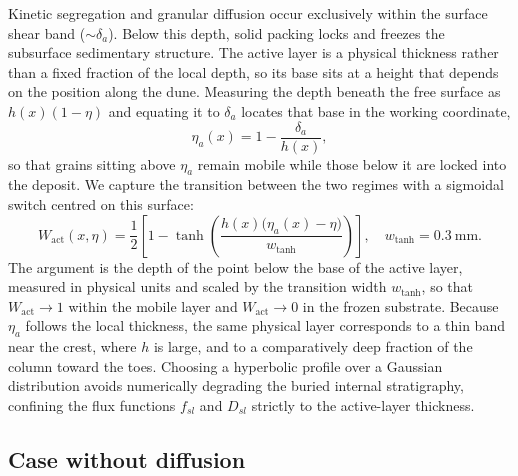 \documentclass[lineno]{JFM-FLM_Au}
\begin{document}
Kinetic segregation and granular diffusion occur exclusively within the surface shear band ($\sim \delta_a$). Below this depth, solid packing locks and freezes the subsurface sedimentary structure. The active layer is a physical thickness rather than a fixed fraction of the local depth, so its base sits at a height that depends on the position along the dune. Measuring the depth beneath the free surface as $h(x)(1-\eta)$ and equating it to $\delta_a$ locates that base in the working coordinate,
\begin{equation}
    \eta_a(x) = 1 - \frac{\delta_a}{h(x)},
    \label{eq:etaa}
\end{equation}
so that grains sitting above $\eta_a$ remain mobile while those below it are locked into the deposit. We capture the transition between the two regimes with a sigmoidal switch centred on this surface:
\begin{equation}
    W_{\mathrm{act}}(x,\eta) = \frac{1}{2}\left[1 - \tanh\!\left(\frac{h(x)\big(\eta_a(x)-\eta\big)}{w_{\tanh}}\right)\right], \quad w_{\tanh} = 0.3~\mathrm{mm}.
    \label{eq:Wact}
\end{equation}
The argument is the depth of the point below the base of the active layer, measured in physical units and scaled by the transition width $w_{\tanh}$, so that $W_{\mathrm{act}} \to 1$ within the mobile layer and $W_{\mathrm{act}} \to 0$ in the frozen substrate. Because $\eta_a$ follows the local thickness, the same physical layer corresponds to a thin band near the crest, where $h$ is large, and to a comparatively deep fraction of the column toward the toes. Choosing a hyperbolic profile over a Gaussian distribution avoids numerically degrading the buried internal stratigraphy, confining the flux functions $f_{sl}$ and $D_{sl}$ strictly to the active-layer thickness.


\subsection{Case without diffusion}
\label{sec:nodiff}
\end{document}
